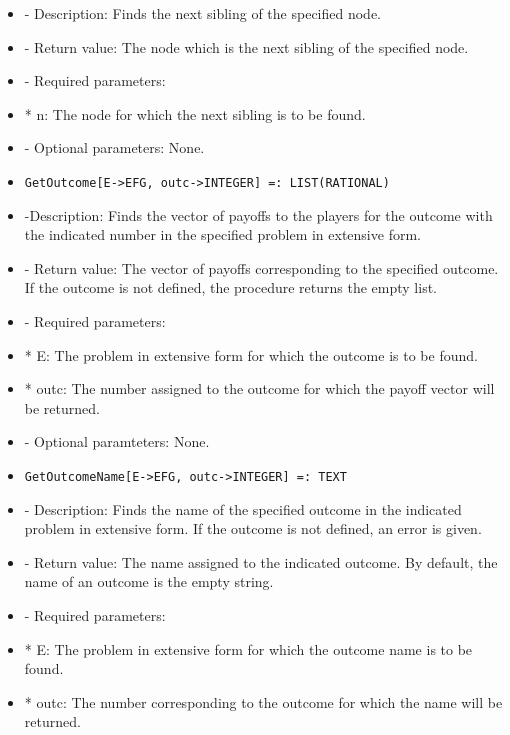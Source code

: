 \begin{itemize}
\bd
\item
- Description:  Finds the next sibling of the specified node.
\item
- Return value:  The node which is the next sibling of the specified 
node.
\item
- Required parameters:

\bd
\item
*  n:  The node for which the next sibling is to be found.
\ed

\item
- Optional parameters:  None.
\ed

\item
\begin{verbatim}
GetOutcome[E->EFG, outc->INTEGER] =: LIST(RATIONAL)
\end{verbatim}

\bd
\item
-Description:  Finds the vector of payoffs to the players for the 
outcome with the indicated number in the specified problem in extensive
form.
\item
- Return value:  The vector of payoffs corresponding to the specified 
outcome.  If the outcome is not defined, the procedure returns the 
empty list.
\item
- Required parameters:

\bd
\item
*  E:  The problem in extensive form for which the outcome is to be found.
\item
*  outc:  The number assigned to the outcome for which the payoff 
vector will be returned.
\ed

\item
- Optional paramteters:  None.
\ed

\item
\begin{verbatim}
GetOutcomeName[E->EFG, outc->INTEGER] =: TEXT
\end{verbatim}

\bd

\item
- Description:  Finds the name of the specified outcome in the indicated
problem in extensive form.  If the outcome is not defined, an error is
given.
\item
- Return value:  The name assigned to the indicated outcome.  By default,
the name of an outcome is the empty string.
\item
- Required parameters:

\bd
\item	  
*  E:  The problem in extensive form for which the outcome name is to
be found.
\item
*  outc:  The number corresponding to the outcome for which the name 
will be returned.
\ed


\end{itemize}
